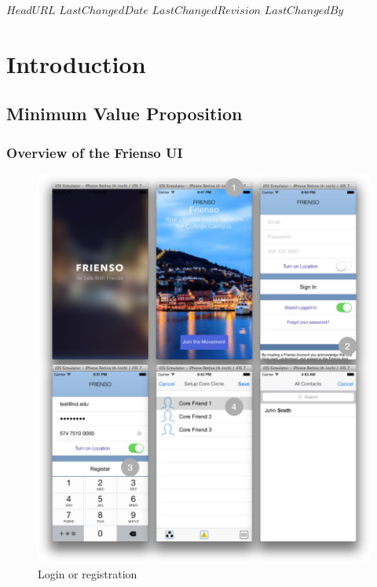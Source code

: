 \svnidlong
{$HeadURL$}
{$LastChangedDate$}
{$LastChangedRevision$}
{$LastChangedBy$}

\chapter{Introduction}

\begin{introduction}
\end{introduction}

\section{Minimum Value Proposition}
\begin{introduction}
  
\end{introduction}
\subsection{Overview of the Frienso UI}
\begin{figure}
 \centering
  \includegraphics[width=\textwidth]{images/mvp_actual0.jpg}
	\caption{
	Login or registration   
	}
	\end{figure}


